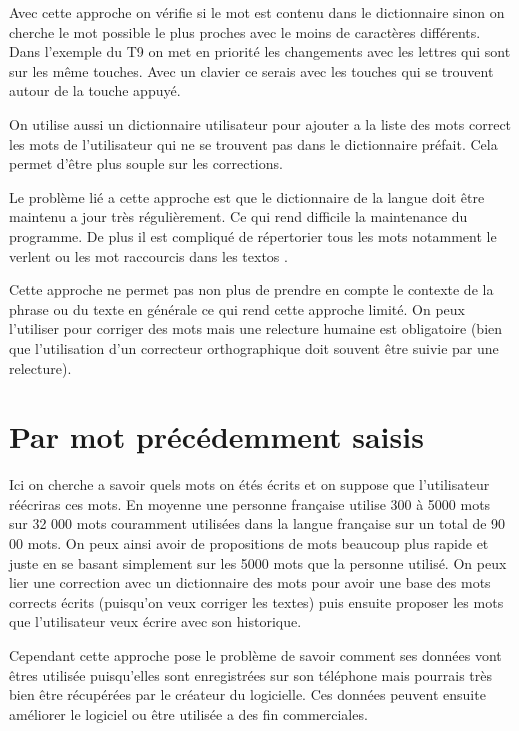 \documentclass[final, 10pt]{report}
\begin{document}
    
    Avec cette approche on vérifie si le mot est contenu dans le dictionnaire sinon on cherche le mot possible le plus proches avec le moins de caractères différents. 
    Dans l'exemple du T9 on met en priorité les changements avec les lettres qui sont sur les même touches. 
    Avec un clavier ce serais avec les touches qui se trouvent autour de la touche appuyé.
    
    
    On utilise aussi un dictionnaire utilisateur pour ajouter a la liste des mots correct les mots de l'utilisateur qui ne se trouvent pas dans le dictionnaire préfait.
    Cela permet d'être plus souple sur les corrections.
    
    Le problème lié a cette approche est que le dictionnaire de la langue doit être maintenu a jour très régulièrement. Ce qui rend difficile la maintenance du programme. De plus il est compliqué de répertorier tous les mots notamment le \og verlent \fg{} ou les mot raccourcis dans les \og textos \fg{}.
    
    Cette approche ne permet pas non plus de prendre en compte le contexte de la phrase ou du texte en générale ce qui rend cette approche limité. On peux l'utiliser pour corriger des mots mais une relecture humaine est obligatoire (bien que l'utilisation d'un correcteur orthographique doit souvent être suivie par une relecture).


\section{Par mot précédemment saisis}

    Ici on cherche a savoir quels mots on étés écrits et on suppose que l'utilisateur réécriras ces mots.
    En moyenne une personne française utilise 300 à 5000 mots\cite{admin6658_combien_2020} sur 32 000 mots couramment utilisées\cite{noauthor_combien_nodate} dans la langue française sur un total de 90 00 mots.
    On peux ainsi avoir de propositions de mots beaucoup plus rapide et juste en se basant simplement sur les 5000 mots que la personne utilisé.
    On peux lier une correction avec un dictionnaire des mots pour avoir une base des mots corrects écrits (puisqu'on veux corriger les textes) puis ensuite proposer les mots que l'utilisateur veux écrire avec son historique.
    
    Cependant cette approche pose le problème de savoir comment ses données vont êtres utilisée puisqu'elles sont enregistrées sur son téléphone mais pourrais très bien être récupérées par le créateur du logicielle.
    Ces données peuvent ensuite améliorer le logiciel ou être utilisée a des fin commerciales.
    
\end{document}
